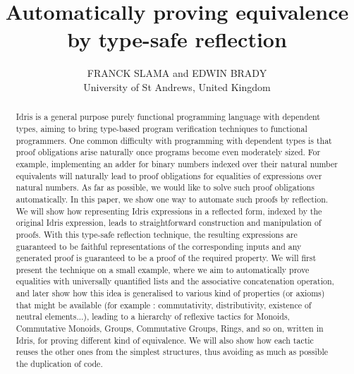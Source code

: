 \documentclass{jfp1}
\title[Automatically proving equivalence by type-safe reflection]
      {Automatically proving equivalence by type-safe reflection}
\author[Franck Slama and Edwin Brady]
        {FRANCK SLAMA and EDWIN BRADY\\
         University of St Andrews, United Kingdom\\
         \email{fs39@st-andrews.ac.uk, ecb10@st-andrews.ac.uk}}
\begin{document}
\label{firstpage}

\maketitle

\begin{abstract}
Idris is a general purpose purely functional programming language with dependent types, aiming to bring type-based program verification techniques to functional programmers. One common difficulty with programming with dependent types is that proof obligations arise naturally once programs become even moderately sized. For example, implementing an adder for binary numbers indexed over their natural number equivalents will naturally lead to proof obligations for equalities of expressions over natural numbers. 
As far as possible, we would like to solve such proof obligations automatically. In this paper, we show one way to automate such proofs by reflection. We will show how representing Idris expressions in a reflected form, indexed by the original Idris expression, leads to straightforward construction and manipulation of proofs.
With this type-safe reflection technique, the resulting expressions are guaranteed to be faithful representations of the corresponding inputs and any generated proof is guaranteed to be a proof of the required property. 
We will first present the technique on a small example, where we aim to automatically prove equalities with universally quantified lists and the associative concatenation operation, and later show how this idea is generalised to various kind of properties (or axioms) that might be available (for example : commutativity, distributivity, existence of neutral elements...), leading to a hierarchy of reflexive tactics for Monoids, Commutative Monoids, Groups, Commutative Groups, Rings, and so on, written in Idris, for proving different kind of equivalence. We will also show how each tactic reuses the other ones from the simplest structures, thus avoiding as much as possible the duplication of code.
\end{abstract}



\end{document}
